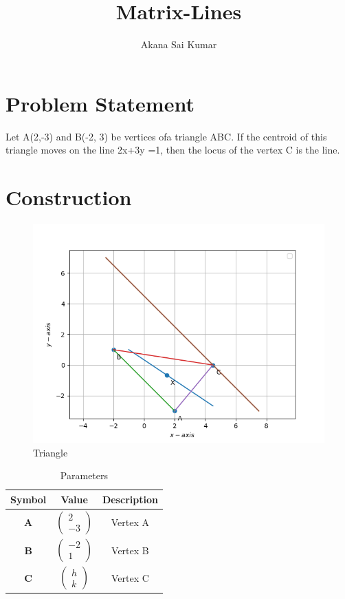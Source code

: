 \documentclass[journal,12pt,twocolumn]{IEEEtran}
\title{
Matrix-Lines
}
\author{Akana Sai Kumar}
\newcommand{\myvec}[1]{\ensuremath{\begin{pmatrix}#1\end{pmatrix}}}
\let\vec\mathbf
\begin{document}
\maketitle
\tableofcontents
\bigskip
\section{Problem Statement}
Let A(2,-3) and B(-2, 3) be vertices ofa triangle ABC. If
the centroid of this triangle moves on the line
2x+3y =1, then the locus of the vertex C is the line.\\
\section{Construction}
\begin{figure}[h]
    \centering
\includegraphics[width=\columnwidth]{mat1.png}
    \caption{Triangle}
    \label{fig:my_label}
\end{figure}
\vspace{2cm}
\begin{table}[h]
    \centering
    \begin{tabular}{|c|c|c|}
       \hline
       \textbf{Symbol}&\textbf{Value}&\textbf{Description}  \\
       \hline
	    $\vec{A}$ & $\myvec{2\\-3}$
	    & Vertex A\\
        \hline
	    $\vec{B}$ & $\myvec{-2\\1}$
 & Vertex B\\
        \hline
	    $\vec{C}$ & $\myvec{h\\k}$
 & Vertex C\\
        \hline
    \end{tabular}
    \caption{Parameters}
    \label{tab:my_label}
\end{table}
\end{document}
